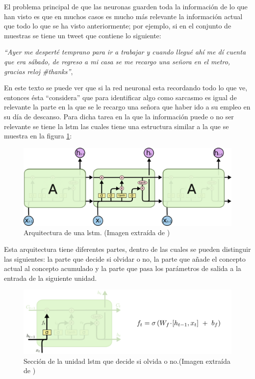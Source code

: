 \par El problema principal de que las neuronas guarden toda la información de lo que han visto es que en muchos casos es mucho más relevante la información actual que todo lo que se ha visto anteriormente; por ejemplo, si en el conjunto de muestras se tiene un tweet que contiene lo siguiente:
\vspace{5pt}
\begin{center}
	\textit{``Ayer me desperté temprano para ir a trabajar y cuando llegué ahí me dí cuenta que era sábado, de regreso a mi casa se me recargo una señora en el metro, gracias reloj \#thanks''},
	\label{fig:frase}
\end{center}
\vspace{5pt}

\par En este texto se puede ver que si la red neuronal esta recordando todo lo que ve, entonces ésta ``considera'' que para identificar algo como sarcasmo es igual de relevante la parte en la que se le recargo una señora que haber ido a su empleo en su día de descanso. Para dicha tarea en la que la información puede o no ser relevante se tiene la \gls{lstm} las cuales tiene una estructura similar a la que se muestra en la figura \ref{fig:3.11}:

\begin{figure}[H]
	\centering
	\includegraphics[width=\textwidth]{imagenes/LSTM3-chain.png}
	\caption[]{Arquitectura de una \gls{lstm}. (Imagen extraída de \textcite{christopher_olah_2015})}
	\label{fig:3.11}
\end{figure}


\par Esta arquitectura tiene diferentes partes, dentro de las cuales se pueden distinguir las siguientes: la parte que decide si olvidar o no, la parte que añade el concepto actual al concepto acumulado y la parte que pasa los parámetros de salida a la entrada de la siguiente unidad.

\begin{figure}[H]
	\centering
	\includegraphics[width=\textwidth]{imagenes/LSTM3-focus-f.png}
	\caption[]{Sección de la unidad \gls{lstm} que decide si olvida o no.(Imagen extraída de \textcite{christopher_olah_2015})}
	\label{fig:lstmOlvidar}
\end{figure}


